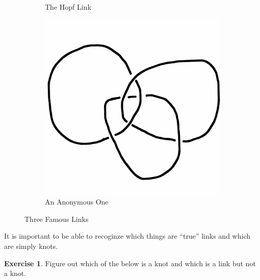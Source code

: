\documentclass[12pt,letterpaper]{article}
\theoremstyle{definition}
\newtheorem{exercise}[question]{Exercise}
\begin{document}
\begin{figure}[h]
\begin{subfigure}{.3\textwidth}
        \caption{The Hopf Link}
    \end{subfigure}
    \quad
    \begin{subfigure}{.3\textwidth}
        \centering
        \includegraphics[width=\textwidth]{knotpics/tj3.png}
        \caption{An Anonymous One}
    \end{subfigure}
    \caption{Three Famous Links}
\end{figure}

\clearpage

It is important to be able to recoginze which things are ``true'' links and which are simply knots.

\begin{exercise}
Figure out which of the below is a knot and which is a link but not a knot.
\end{exercise}
\end{document}
